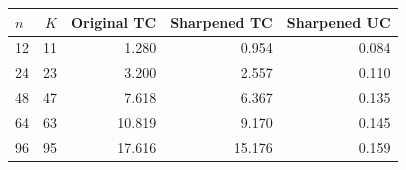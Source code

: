 \begin{tabular}{@{}lrrrr@{}}
\toprule
$n$ & $K$ & Original TC & Sharpened TC & Sharpened UC\\
\midrule
12 & 11 & 1.280 & 0.954 & 0.084\\
24 & 23 & 3.200 & 2.557 & 0.110\\
48 & 47 & 7.618 & 6.367 & 0.135\\
64 & 63 & 10.819 & 9.170 & 0.145\\
96 & 95 & 17.616 & 15.176 & 0.159\\
\bottomrule
\end{tabular}
